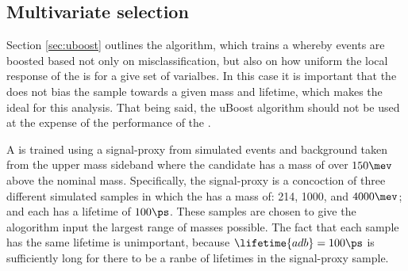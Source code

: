 \subsection{Multivariate selection}
Section \ref{sec:uboost} outlines the \uBDT algorithm, which trains a \bdt whereby events are
boosted based not only on misclassification, but also on how uniform the local response of the \bdt
is for a give set of varialbes.
In this case it is important that the \bdt does not bias the sample towards a given mass and
lifetime, which makes the \uBDT ideal for this analysis.
That being said, the uBoost algorithm should not be used at the expense of the performance of the
\bdt.

A \uBDT is trained using a signal-proxy from simulated events and background taken from the upper
\Bd mass sideband where the \Bd candidate has a mass of over $150\mev$ above the nominal \Bd mass.
Specifically, the signal-proxy is a concoction of three different simulated samples in which the
\db has a mass of: 214, 1000, and $4000\mev$; and each has a lifetime of $100\ps$.
These samples are chosen to give the \uBDT alogorithm input the largest range of masses possible.
The fact that each sample has the same lifetime is unimportant, because $\lifetime{adb}=100\ps$ is
sufficiently long for there to be a ranbe of lifetimes in the signal-proxy sample.











